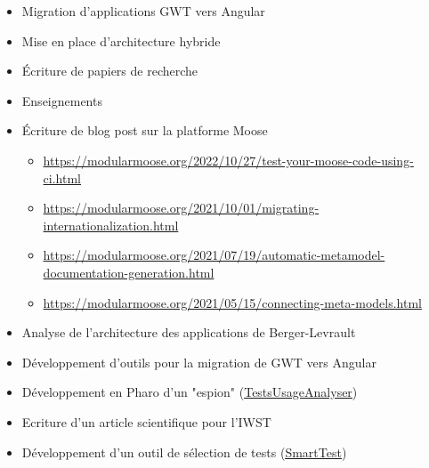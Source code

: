 \documentclass[10pt,a4paper,ragged2e,withhyper]{altacv}
\begin{document}
\divider

\begin{itemize}
\item Migration d'applications GWT vers Angular
\item Mise en place d'architecture hybride
\item Écriture de papiers de recherche
\item Enseignements
\item Écriture de blog post sur la platforme Moose
\begin{itemize}
  \item \url{https://modularmoose.org/2022/10/27/test-your-moose-code-using-ci.html}
  \item \url{https://modularmoose.org/2021/10/01/migrating-internationalization.html}
  \item \url{https://modularmoose.org/2021/07/19/automatic-metamodel-documentation-generation.html}
  \item \url{https://modularmoose.org/2021/05/15/connecting-meta-models.html}
\end{itemize}

\end{itemize}

\divider

\begin{itemize}
\item Analyse de l’architecture des applications de Berger-Levrault
\item Développement d'outils pour la migration de GWT vers Angular
\end{itemize}

\divider

\begin{itemize}
  \item Développement en Pharo d'un "espion" (\href{https://badetitou.fr/projects/TUA/}{\color{blue}\underline{TestsUsageAnalyser}})
  \item Ecriture d'un article scientifique pour l'IWST
  \item Développement d'un outil de sélection de tests (\href{https://badetitou.fr/projects/SmartTest/}{\color{blue}\underline{SmartTest}})
\end{itemize}
\end{document}
